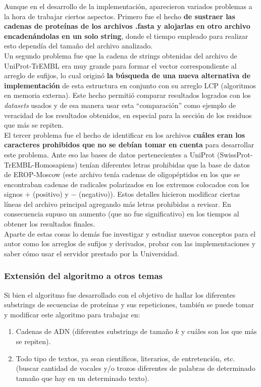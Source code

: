 Aunque en el desarrollo de la implementación, aparecieron variados problemas a la hora de trabajar ciertos aspectos. Primero fue el hecho \textbf{de sustraer las cadenas de proteínas de los archivos .fasta y alojarlas en otro archivo encadenándolas en un solo string}, donde el tiempo empleado para realizar esto dependía del tamaño del archivo analizado.\\
Un segundo problema fue que la cadena de strings obtenidas del archivo de UniProt-TrEMBL era muy grande para formar el vector correspondiente al arreglo de sufijos, lo cual originó \textbf{la búsqueda de una nueva alternativa de implementación} de esta estructura en conjunto con su arreglo LCP (algoritmos en memoria externa). Este hecho permitió comparar resultados logrados con los \textit{datasets} usados y de esa manera usar esta ``comparación'' como ejemplo de veracidad de los resultados obtenidos, en especial para la sección de los residuos que más se repiten.\\
El tercer problema fue el hecho de identificar en los archivos \textbf{cuáles eran los caracteres prohibidos que no se debían tomar en cuenta} para desarrollar este problema. Ante eso las bases de datos pertenecientes a UniProt (SwissProt-TrEMBL-Homosapiens) tenían diferentes letras prohibidas que la base de datos de EROP-Moscow (este archivo tenía cadenas de oligopéptidos en los que se encontraban cadenas de radicales polarizados en los extremos colocados con los signos $+$ (positivo) y $-$ (negativo)). Estos detalles hicieron modificar ciertas líneas del archivo principal agregando más letras prohibidas a revisar. En consecuencia supuso un aumento (que no fue significativo) en los tiempos al obtener los resultados finales.\\
Aparte de estas cosas lo demás fue investigar y estudiar nuevos conceptos para el autor como los arreglos de sufijos y derivados, probar con las implementaciones y saber cómo usar el servidor prestado por la Universidad.

\subsubsection{Extensión del algoritmo a otros temas}

Si bien el algoritmo fue desarrollado con el objetivo de hallar los diferentes substrings de secuencias de proteínas y sus repeticiones, también se puede tomar y modificar este algoritmo para trabajar en:

\begin{enumerate}

\item Cadenas de ADN (diferentes substrings de tamaño $k$ y cuáles son los que más se repiten).
\item Todo tipo de textos, ya sean científicos, literarios, de entretención, etc. (buscar cantidad de vocales y/o trozos diferentes de palabras de determinado tamaño que hay en un determinado texto).

\end{enumerate}

